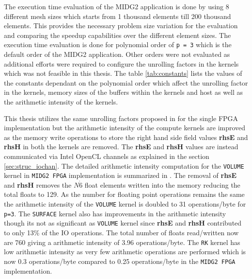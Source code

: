 The execution time evaluation of the MIDG2 application is done by using
8 different mesh sizes which starts from 1 thousand elements till
200 thousand elements. This provides the necessary problem size
variation for the evaluation and comparing the speedup capabilities
over the different element sizes. The execution time evaluation
is done for polynomial order of \texttt{p = 3} which is the default
order of the MIDG2 application. Other orders were not evaluated as
additional efforts were required to configure the unrolling factors
in the kernels which was not feasible in this thesis. The table
\ref{tab:constants} lists the values of the constants dependant
on the polynomial order which affect the unrolling factor in the
kernels, memory sizes of the buffers within the kernels and
host as well as the arithmetic intensity of the kernels.

This thesis utilizes the same unrolling factors proposed in
\cite{kenter_opencl-based_2018} for the single FPGA implementation
but the arithmetic intensity of the compute kernels are
improved as the memory write operations to store the right hand side field values
\textbf{rhsE} and \textbf{rhsH} in both the kernels are removed.
The \textbf{rhsE} and \textbf{rhsH} values are instead communicated via Intel OpenCL channels
as explained in the section \ref{sec:struc_iochan}. The detailed arithmetic intensity
computation for the \texttt{VOLUME} kernel in \texttt{MIDG2 FPGA} implementation is summarized
in \cite{kenter_opencl-based_2018, TABLE I}. The removal of \textbf{rhsE} and \textbf{rhsH}
removes the $N\dot{6}$ float elements written into the memory
reducing the total floats to 129. As the number for floating point operations remains the same
the arithmetic intensity of the \texttt{VOLUME} kernel is doubled to 31 operations/byte for \texttt{p=3}.
The \texttt{SURFACE} kernel also has improvements in the arithmetic intensity though its not
as significant as \texttt{VOLUME} kernel since \textbf{rhsE} and \textbf{rhsH} contributed
to only 13\% of the IO operations. The total number of floats read/written now are 760
giving a arithmetic intensity of 3.96 operations/byte. The \texttt{RK} kernel has low arithmetic
intensity as very few arithmetic operations are performed which is now 0.3 operations/byte
compared to 0.25 operations/byte in the \texttt{MIDG2 FPGA} implementation.

